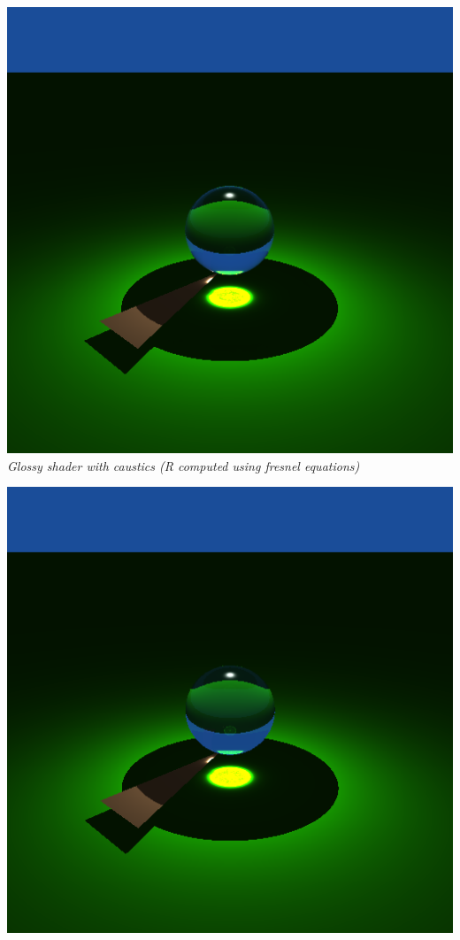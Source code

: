 \documentclass[a4,12pt]{article}
\begin{document}
	\begin{center}
		\begin{minipage}[b]{0.40\linewidth}
			\begin{center}
				\includegraphics[width = \textwidth]{./Worksheet8/withcaustics.png}\\
				\textit{Glossy shader with caustics (R computed using fresnel equations)}\\
			\end{center}
		\end{minipage}
		\hspace{0.05\linewidth}
		\begin{minipage}[b]{0.40\linewidth}
			\begin{center}
				\includegraphics[width = \textwidth]{./Worksheet7/causticsandillumination.png}\\

\end{center}
\end{minipage}
\end{center}
\end{document}
